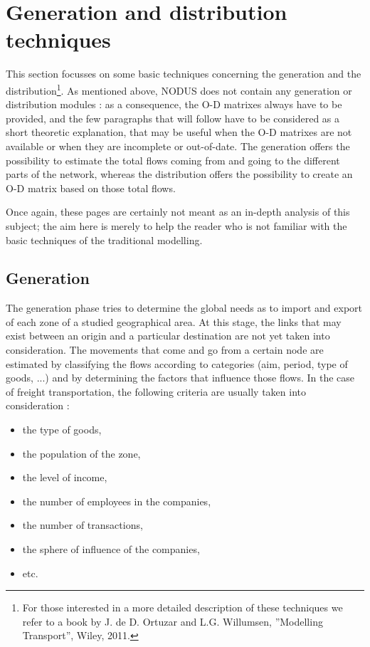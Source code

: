 \section{Generation and distribution techniques}

This section focusses on some basic techniques concerning the generation and the
distribution\footnote{For those interested in a more detailed description of
these techniques we refer to a book by J. de D.
Ortuzar and L.G. Willumsen, ''Modelling Transport'', Wiley, 2011.}.  As
mentioned above, NODUS does not contain any generation or distribution modules :
as a consequence, the O-D matrixes always have to be provided, and the few
paragraphs that will follow have to be considered as a short theoretic
explanation, that may be useful when the O-D matrixes are not available or when
they are incomplete or out-of-date. The generation offers the possibility to
estimate the total flows coming from and going to the different parts of the
network, whereas the distribution offers the possibility to create an O-D matrix
based on those total flows.

Once again, these pages are certainly not meant as an in-depth analysis of this
subject; the aim here is merely to help the reader who is not familiar with the
basic techniques of the traditional modelling.

\subsection{Generation}

The generation phase tries to determine the global needs as to import and export
of each zone of a studied geographical area.  At this stage, the links that may
exist between an origin and a particular destination are not yet taken into
consideration.  The movements that come and go from a certain node are estimated
by classifying the flows according to categories (aim, period, type of goods,
...) and by determining the factors that influence those flows.  In the case of
freight transportation, the following criteria are usually taken into
consideration :
\begin{itemize}
\item the type of goods,
\item the population of the zone,
\item the level of income,
\item the number of employees in the companies,
\item the number of transactions,
\item the sphere of influence of the companies,
\item etc.
\end{itemize}


